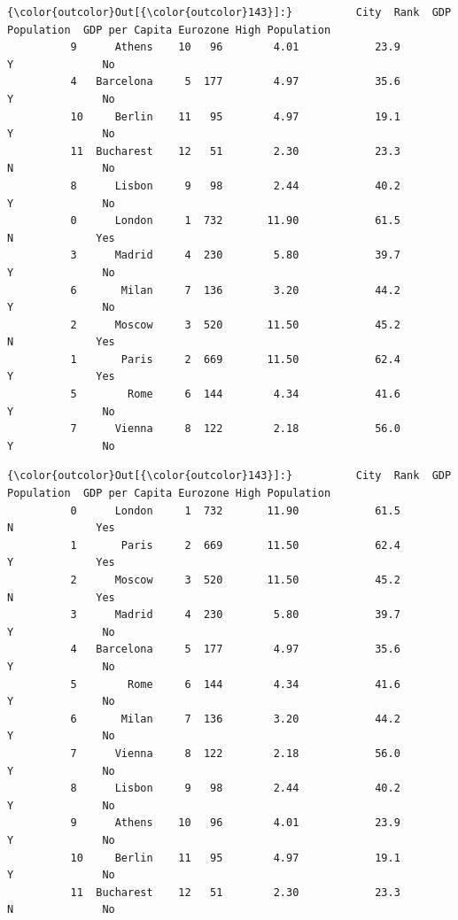\documentclass[11pt]{article}
\begin{document}
\begin{Verbatim}[commandchars=\\\{\}]
{\color{outcolor}Out[{\color{outcolor}143}]:}          City  Rank  GDP  Population  GDP per Capita Eurozone High Population
          9      Athens    10   96        4.01            23.9        Y              No
          4   Barcelona     5  177        4.97            35.6        Y              No
          10     Berlin    11   95        4.97            19.1        Y              No
          11  Bucharest    12   51        2.30            23.3        N              No
          8      Lisbon     9   98        2.44            40.2        Y              No
          0      London     1  732       11.90            61.5        N             Yes
          3      Madrid     4  230        5.80            39.7        Y              No
          6       Milan     7  136        3.20            44.2        Y              No
          2      Moscow     3  520       11.50            45.2        N             Yes
          1       Paris     2  669       11.50            62.4        Y             Yes
          5        Rome     6  144        4.34            41.6        Y              No
          7      Vienna     8  122        2.18            56.0        Y              No
\end{Verbatim}
            
\begin{Verbatim}[commandchars=\\\{\}]
{\color{outcolor}Out[{\color{outcolor}143}]:}          City  Rank  GDP  Population  GDP per Capita Eurozone High Population
          0      London     1  732       11.90            61.5        N             Yes
          1       Paris     2  669       11.50            62.4        Y             Yes
          2      Moscow     3  520       11.50            45.2        N             Yes
          3      Madrid     4  230        5.80            39.7        Y              No
          4   Barcelona     5  177        4.97            35.6        Y              No
          5        Rome     6  144        4.34            41.6        Y              No
          6       Milan     7  136        3.20            44.2        Y              No
          7      Vienna     8  122        2.18            56.0        Y              No
          8      Lisbon     9   98        2.44            40.2        Y              No
          9      Athens    10   96        4.01            23.9        Y              No
          10     Berlin    11   95        4.97            19.1        Y              No
          11  Bucharest    12   51        2.30            23.3        N              No
\end{Verbatim}
            
\end{document}
